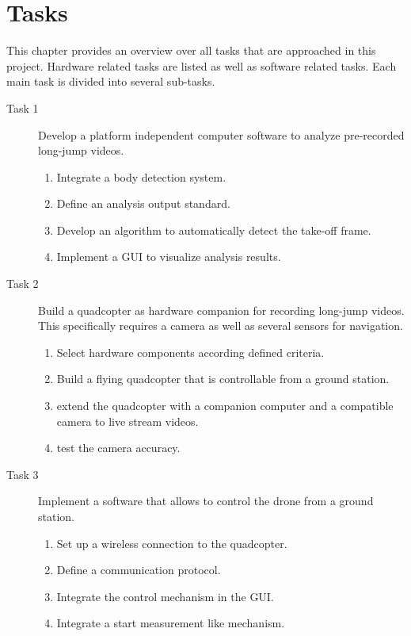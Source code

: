 \graphicspath{{./figures/}}
\chapter{Tasks}
This chapter provides an overview over all tasks that are approached in this
project.
Hardware related tasks are listed as well as software related tasks.
Each main task is divided into several sub-tasks.

\begin{description}
    \item[Task 1] Develop a platform independent computer software to analyze 
    pre-recorded long-jump videos.
    \begin{enumerate}
        \item Integrate a body detection system.
        \item Define an analysis output standard.
        \item Develop an algorithm to automatically detect the take-off frame. 
        \item Implement a \acs*{GUI} to visualize analysis results.
    \end{enumerate}
    \item[Task 2] Build a quadcopter as hardware companion for recording 
    long-jump videos. This specifically requires a camera as well as several
    sensors for navigation.
    \begin{enumerate}
        \item Select hardware components according defined criteria.
        \item Build a flying quadcopter that is controllable from a ground
        station.
        \item extend the quadcopter with a companion computer and a compatible
        camera to live stream videos.
        \item test the camera accuracy.
    \end{enumerate}
    \item[Task 3] Implement a software that allows to control the drone from a
    ground station.
    \begin{enumerate}
        \item Set up a wireless connection to the quadcopter.
        \item Define a communication protocol.
        \item Integrate the control mechanism in the \acs*{GUI}.
        \item Integrate a start measurement like mechanism.

\end{enumerate}
\end{description}

